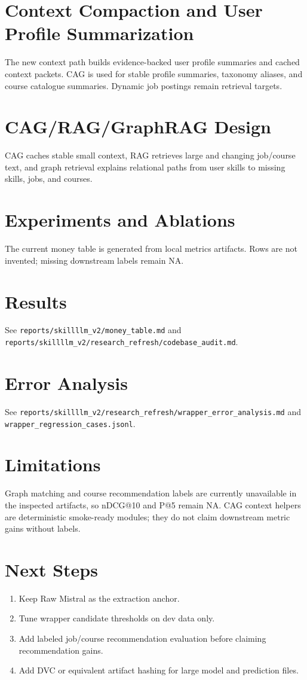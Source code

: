\documentclass[11pt]{article}
\begin{document}
\section{Context Compaction and User Profile Summarization}
The new context path builds evidence-backed user profile summaries and cached context packets. CAG is used for stable profile summaries, taxonomy aliases, and course catalogue summaries. Dynamic job postings remain retrieval targets.

\section{CAG/RAG/GraphRAG Design}
CAG caches stable small context, RAG retrieves large and changing job/course text, and graph retrieval explains relational paths from user skills to missing skills, jobs, and courses.

\section{Experiments and Ablations}
The current money table is generated from local metrics artifacts. Rows are not invented; missing downstream labels remain NA.

\section{Results}
See \texttt{reports/skillllm\_v2/money\_table.md} and \texttt{reports/skillllm\_v2/research\_refresh/codebase\_audit.md}.

\section{Error Analysis}
See \texttt{reports/skillllm\_v2/research\_refresh/wrapper\_error\_analysis.md} and \texttt{wrapper\_regression\_cases.jsonl}.

\section{Limitations}
Graph matching and course recommendation labels are currently unavailable in the inspected artifacts, so nDCG@10 and P@5 remain NA. CAG context helpers are deterministic smoke-ready modules; they do not claim downstream metric gains without labels.

\section{Next Steps}
\begin{enumerate}
\item Keep Raw Mistral as the extraction anchor.
\item Tune wrapper candidate thresholds on dev data only.
\item Add labeled job/course recommendation evaluation before claiming recommendation gains.
\item Add DVC or equivalent artifact hashing for large model and prediction files.
\end{enumerate}
\end{document}
